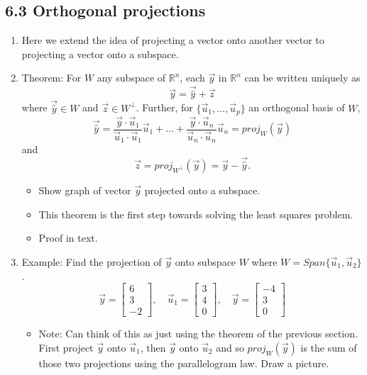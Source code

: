 \documentclass{article}
\begin{document}
\subsection{6.3 Orthogonal projections}

\begin{enumerate}

\item Here we extend the idea of projecting a vector onto another vector to projecting a vector onto a subspace.

\item Theorem: For $W$ any subspace of $\mathbb{R}^n$, each $\vec{y}$ in $\mathbb{R}^n$ can be written uniquely as
\[
\vec{y} = \vec{\hat{y}} + \vec{z}
\]
where $\vec{\hat{y}} \in W$ and $\vec{z} \in W^{\perp}$. Further, for $\{ \vec{u}_1, \dots , \vec{u}_p \}$ an orthogonal basis of $W$, 
\[
\vec{\hat{y}} = \frac{\vec{y} \cdot \vec{u}_1}{\vec{u}_1 \cdot \vec{u}_1} \vec{u}_1 + \dots + \frac{\vec{y} \cdot \vec{u}_n}{\vec{u}_n \cdot \vec{u}_n} \vec{u}_n = proj_{W}(\vec{y})
\]
and 
\[
\vec{z} = proj_{W^{\perp}} (\vec{y}) = \vec{y} - \vec{\hat{y}}.
\]
\begin{itemize}
\item Show graph of vector $\vec{y}$ projected onto a subspace.
\item This theorem is the first step towards solving the least squares problem.
\item Proof in text.
\end{itemize}

\item Example: Find the projection of $\vec{y}$ onto subspace $W$ where $W=Span\{\vec{u}_1, \vec{u}_2 \}$.
\[
\vec{y} = \left[
\begin{array}{c}
6 \\ 3 \\ -2
\end{array}
\right], \quad
\vec{u}_1 = \left[
\begin{array}{c}
3 \\ 4 \\ 0
\end{array}
\right], \quad
\vec{y} = \left[
\begin{array}{c}
-4 \\ 3 \\ 0
\end{array}
\right]
\]
\begin{itemize}
\item Note: Can think of this as just using the theorem of the previous section. First project $\vec{y}$ onto $\vec{u}_1$, then $\vec{y}$ onto $\vec{u}_2$ and so $proj_W(\vec{y})$ is the sum of those two projections using the parallelogram law. Draw a picture.
\end{itemize}



\end{enumerate}
\end{document}

